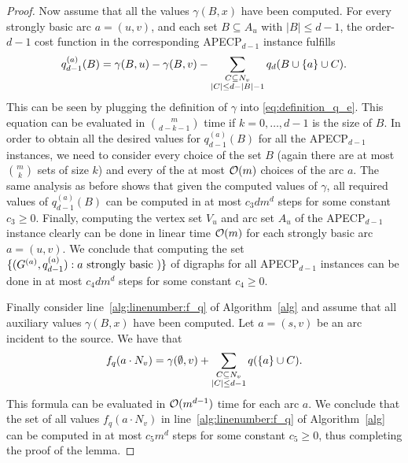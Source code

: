 \begin{proof}
    
    Now assume that all the values $\gamma(B, x)$ have been computed. For every strongly basic arc $a = (u, v)$, and each set $B \subseteq A_u$ with $|B| \leq d-1$, the order-$d-1$ cost function in the corresponding APECP$_{d-1}$ instance fulfills 
    \begin{align*}
        q_{d-1}^{(a)}(B) = \gamma(B,u) - \gamma(B, v) - \sum_{\substack{C \subseteq N_v\\ |C| \leq d - |B| - 1}}q_d(B \cup \{ a \} \cup C).
    \end{align*}
    This can be seen by plugging the definition of $\gamma$ into \cref{eq:definition_q_e}. This equation can be evaluated in $\binom{m}{d - k -1}$ time if $k=0,\dots,d-1$ is the size of $B$. In order to obtain all the desired values for $q^{(a)}_{d-1}(B)$ for all the APECP$_{d-1}$ instances, we need to consider every choice of the set $B$ (again there are at most $\binom{m}{k}$ sets of size $k$) and every of the at most $\mathcal{O}(m)$ choices of the arc $a$. 
    The same analysis as before shows that given the computed values of  $\gamma$, all required values of $q^{(a)}_{d-1}(B)$ can be computed in at most $c_3dm^d$ steps for some constant $c_3 \geq 0$. Finally, computing the vertex set $V_u$ and arc set $A_u$ of the APECP$_{d-1}$ instance clearly can be done in linear time $\mathcal{O}(m)$ for each strongly basic arc $a = (u,v)$. We conclude that computing the set $\{ (G^{(a)}, q^{(a)}_{d-1}) : a \text{ strongly basic }) \}$ of digraphs for  all APECP$_{d-1}$ instances can be done in at most $c_4dm^d$ steps for some constant $c_4 \geq 0$.

    Finally consider line~\ref{alg:linenumber:f_q} of Algorithm~\ref{alg} and assume that all auxiliary  values $\gamma(B,x)$ have been computed. Let $a = (s,v)$ be an arc incident to the source. We have that
    \begin{align*}
        f_q(a \cdot N_v) = \gamma(\emptyset, v) + \sum_{\substack{C \subseteq N_v\\ |C| \leq d - 1}}q(\{ a \} \cup C).
    \end{align*}
    This formula can be evaluated in $\mathcal{O}(m^{d-1})$ time for each arc $a$. We conclude that the set of all values $f_q(a \cdot N_v)$ in line~\ref{alg:linenumber:f_q} of Algorithm~\ref{alg} can be computed in at most $c_5m^d$ steps for some constant $c_5 \geq 0$, thus completing the proof of the lemma.
\end{proof}

